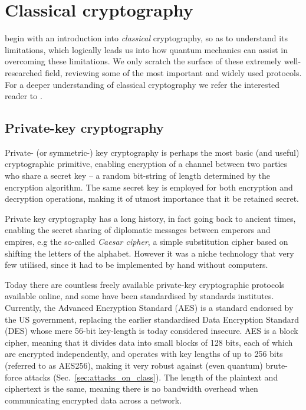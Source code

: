 %
%

\section{Classical cryptography}

 begin with an introduction into \textit{classical} cryptography, so as to understand its limitations, which logically leads us into how quantum mechanics can assist in overcoming these limitations. We only scratch the surface of these extremely well-researched field, reviewing some of the most important and widely used protocols. For a deeper understanding of classical cryptography we refer the interested reader to \cite{bib:Schneier96}.

%
%

\subsection{Private-key cryptography}

Private- (or symmetric-) key cryptography is perhaps the most basic (and useful) cryptographic primitive, enabling encryption of a channel between two parties who share a secret key -- a random bit-string of length determined by the encryption algorithm. The same secret key is employed for both encryption and decryption operations, making it of utmost importance that it be retained secret.

Private key cryptography has a long history, in fact going back to ancient times, enabling the secret sharing of diplomatic messages between emperors and empires, e.g the so-called \textit{Caesar cipher}, a simple substitution cipher based on shifting the letters of the alphabet. However it was a niche technology that very few utilised, since it had to be implemented by hand without computers.

Today there are countless freely available private-key cryptographic protocols available online, and some have been standardised by standards institutes. Currently, the Advanced Encryption Standard (AES) is a standard endorsed by the US government, replacing the earlier standardised Data Encryption Standard (DES) whose mere 56-bit key-length is today considered insecure. AES is a block cipher, meaning that it divides data into small blocks of 128 bits, each of which are encrypted independently, and operates with key lengths of up to 256 bits (referred to as AES256), making it very robust against (even quantum) brute-force attacks (Sec.~\ref{sec:attacks_on_class}). The length of the plaintext and ciphertext is the same, meaning there is no bandwidth overhead when communicating encrypted data across a network.

